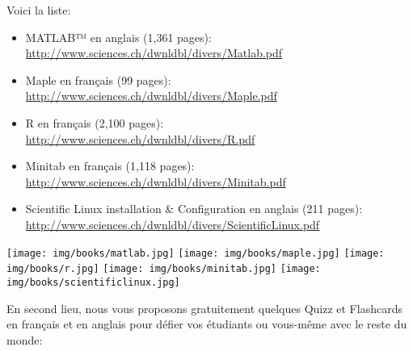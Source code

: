 	Voici la liste:
	\begin{itemize}
		\item MATLAB™ en anglais (1,361 pages):\\ \href{http://www.sciences.ch/htmlfr/php/cliccount/click.php?id=319}{http://www.sciences.ch/dwnldbl/divers/Matlab.pdf}
		
		\item Maple en français (99 pages):\\ \href{http://www.sciences.ch/dwnldbl/divers/Maple.pdf}{http://www.sciences.ch/dwnldbl/divers/Maple.pdf}
		
		\item \textsf{R} en français (2,100 pages):\\ \href{http://www.sciences.ch/htmlfr/php/cliccount/click.php?id=313}{http://www.sciences.ch/dwnldbl/divers/R.pdf}
		
		\item Minitab en français (1,118 pages):\\ \href{http://www.sciences.ch/htmlfr/php/cliccount/click.php?id=282}{http://www.sciences.ch/dwnldbl/divers/Minitab.pdf}
		
		\item Scientific Linux installation \& Configuration en anglais  (211 pages):\\ \href{http://www.sciences.ch/dwnldbl/divers/ScientificLinux.pdf}{http://www.sciences.ch/dwnldbl/divers/ScientificLinux.pdf}
	\end{itemize}
	\begin{center}
		\texttt{[image: img/books/matlab.jpg]}
		\texttt{[image: img/books/maple.jpg]}
		\texttt{[image: img/books/r.jpg]}
		\texttt{[image: img/books/minitab.jpg]}
		\texttt{[image: img/books/scientificlinux.jpg]} 
	\end{center}	
	En second lieu, nous vous proposons gratuitement quelques Quizz et Flashcards en français et en anglais pour défier vos étudiants ou vous-même avec le reste du monde:
